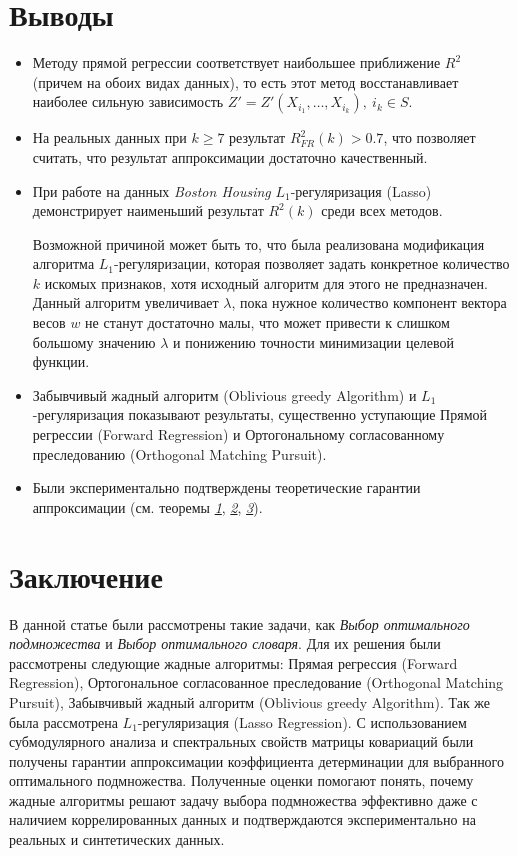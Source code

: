 \documentclass[preprint,12pt]{elsarticle}
\begin{document}
\section{Выводы}
\begin{itemize}
    \item Методу прямой регрессии соответствует наибольшее приближение $R^2$ (причем на обоих видах данных), то есть этот метод восстанавливает наиболее сильную зависимость $Z'=Z'(X_{i_1}, \dots, X_{i_k}),~i_k \in S$.
    \item На реальных данных при $k\geqslant 7$ результат $R^2_{FR}(k) > 0.7$, что позволяет считать, что результат аппроксимации достаточно качественный. 
    \item При работе на данных \textit{Boston Housing} $L_1$-регуляризация (Lasso) демонстрирует наименьший результат $R^2(k)$ среди всех методов. 
    
    
    Возможной причиной может быть то, что была реализована модификация алгоритма $L_1$-регуляризации, которая позволяет задать конкретное количество $k$ искомых признаков, хотя исходный алгоритм для этого не предназначен. Данный алгоритм увеличивает $\lambda$, пока нужное количество компонент вектора весов $w$ не станут достаточно малы, что может привести к слишком большому значению $\lambda$ и понижению точности минимизации целевой функции.
    
    \item Забывчивый жадный алгоритм (Oblivious greedy Algorithm) и $L_1$-регуляризация показывают результаты, существенно уступающие Прямой регрессии (Forward Regression) и  Ортогональному согласованному преследованию (Orthogonal Matching Pursuit). 
    \item Были экспериментально подтверждены теоретические гарантии аппроксимации (см. теоремы \hyperref[t1]{\textit{1}}, \hyperref[t2]{\textit{2}},
    \hyperref[t3]{\textit{3}}).
\end{itemize}

\section{Заключение}

В данной статье были рассмотрены такие задачи, как \textit{Выбор оптимального подмножества} и \textit{Выбор оптимального словаря}. Для их решения были рассмотрены следующие жадные алгоритмы: Прямая регрессия (Forward Regression), Ортогональное согласованное преследование (Orthogonal Matching Pursuit), Забывчивый жадный алгоритм (Oblivious greedy Algorithm). Так же была рассмотрена $L_1$-регуляризация (Lasso Regression). С использованием субмодулярного анализа и спектральных свойств матрицы ковариаций были получены гарантии аппроксимации коэффициента детерминации для выбранного оптимального подмножества. Полученные оценки помогают понять, почему жадные алгоритмы решают задачу выбора подмножества эффективно даже с наличием коррелированных данных и подтверждаются экспериментально на реальных и синтетических данных. 
\end{document}
